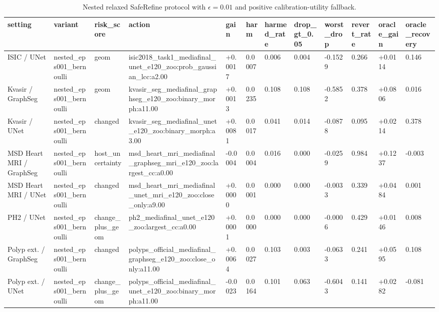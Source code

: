 \begin{table}[t]
\centering
\small
\caption{Nested relaxed SafeRefine protocol with $\epsilon=0.01$ and positive calibration-utility fallback.}
\label{tab:tail_risk_nested_eps001_bernoulli_relaxed}
\begin{tabular}{llllllllllll}
\toprule
setting & variant & risk\_score & action & gain & harm & harmed\_rate & drop\_gt\_0.05 & worst\_drop & revert\_rate & oracle\_gain & oracle\_recovery \\
\midrule
ISIC / UNet & nested\_eps001\_bernoulli & geom & isic2018\_task1\_mediafinal\_unet\_e120\_zoo:prob\_gaussian\_lcc:a2.00 & +0.0017 & 0.0007 & 0.006 & 0.004 & -0.1529 & 0.266 & +0.0114 & 0.146 \\
Kvasir / GraphSeg & nested\_eps001\_bernoulli & geom & kvasir\_seg\_mediafinal\_graphseg\_e120\_zoo:binary\_morph:a11.00 & +0.0013 & 0.0235 & 0.108 & 0.108 & -0.5852 & 0.378 & +0.0806 & 0.016 \\
Kvasir / UNet & nested\_eps001\_bernoulli & changed & kvasir\_seg\_mediafinal\_unet\_e120\_zoo:binary\_morph:a3.00 & +0.0081 & 0.0017 & 0.041 & 0.014 & -0.0878 & 0.095 & +0.0214 & 0.378 \\
MSD Heart MRI / GraphSeg & nested\_eps001\_bernoulli & host\_uncertainty & msd\_heart\_mri\_mediafinal\_graphseg\_mri\_e120\_zoo:largest\_cc:a0.00 & -0.0004 & 0.0004 & 0.016 & 0.000 & -0.0259 & 0.984 & +0.1237 & -0.003 \\
MSD Heart MRI / UNet & nested\_eps001\_bernoulli & changed & msd\_heart\_mri\_mediafinal\_unet\_mri\_e120\_zoo:close\_only:a9.00 & +0.0000 & 0.0001 & 0.000 & 0.000 & -0.0033 & 0.339 & +0.0484 & 0.001 \\
PH2 / UNet & nested\_eps001\_bernoulli & change\_plus\_geom & ph2\_mediafinal\_unet\_e120\_zoo:largest\_cc:a0.00 & +0.0001 & 0.0000 & 0.000 & 0.000 & -0.0006 & 0.429 & +0.0146 & 0.008 \\
Polyp ext. / GraphSeg & nested\_eps001\_bernoulli & changed & polyps\_official\_mediafinal\_graphseg\_e120\_zoo:close\_only:a11.00 & +0.0064 & 0.0027 & 0.103 & 0.003 & -0.0633 & 0.241 & +0.0595 & 0.108 \\
Polyp ext. / UNet & nested\_eps001\_bernoulli & change\_plus\_geom & polyps\_official\_mediafinal\_unet\_e120\_zoo:binary\_morph:a11.00 & -0.0023 & 0.0164 & 0.101 & 0.063 & -0.6043 & 0.141 & +0.0282 & -0.081 \\
\bottomrule
\end{tabular}
\end{table}

